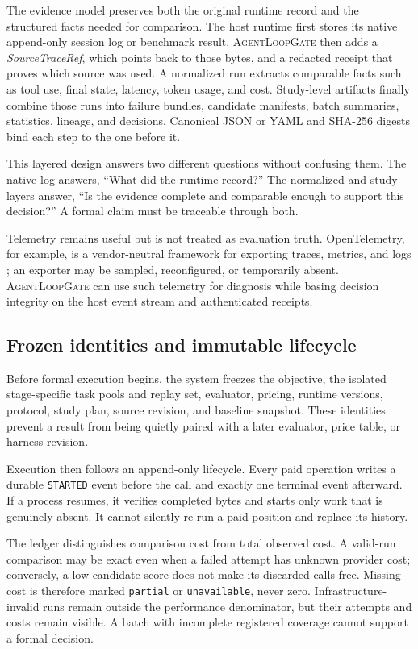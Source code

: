 \documentclass[10pt,twocolumn]{article}
\newcommand{\system}{\textsc{AgentLoopGate}\xspace}
\newcommand{\code}[1]{\texttt{#1}}
\begin{document}
The evidence model preserves both the original runtime record and the
structured facts needed for comparison. The host runtime first stores its
native append-only session log or benchmark result. \system then adds a
\emph{SourceTraceRef}, which points back to those bytes, and a redacted receipt
that proves which source was used. A normalized run extracts comparable facts
such as tool use, final state, latency, token usage, and cost. Study-level
artifacts finally combine those runs into failure bundles, candidate manifests,
batch summaries, statistics, lineage, and decisions. Canonical JSON or YAML and
SHA-256 digests bind each step to the one before it.

This layered design answers two different questions without confusing them.
The native log answers, ``What did the runtime record?'' The normalized and
study layers answer, ``Is the evidence complete and comparable enough to
support this decision?'' A formal claim must be traceable through both.

Telemetry remains useful but is not treated as evaluation truth.
OpenTelemetry, for example, is a vendor-neutral framework for exporting
traces, metrics, and logs \cite{opentelemetry2026}; an exporter may be sampled,
reconfigured, or temporarily absent. \system can use such telemetry for
diagnosis while basing decision integrity on the host event stream and
authenticated receipts.

\subsection{Frozen identities and immutable lifecycle}

Before formal execution begins, the system freezes the objective, the isolated
stage-specific task pools and replay set, evaluator, pricing, runtime versions,
protocol, study plan, source revision, and baseline snapshot. These identities
prevent a result from being quietly paired with a later evaluator, price table,
or harness revision.

Execution then follows an append-only lifecycle. Every paid operation writes a
durable \code{STARTED} event before the call and exactly one terminal event
afterward. If a process resumes, it verifies completed bytes and starts only
work that is genuinely absent. It cannot silently re-run a paid position and
replace its history.

The ledger distinguishes comparison cost from total observed cost. A valid-run
comparison may be exact even when a failed attempt has unknown provider cost;
conversely, a low candidate score does not make its discarded calls free.
Missing cost is therefore marked \code{partial} or \code{unavailable}, never
zero. Infrastructure-invalid runs remain outside the performance denominator,
but their attempts and costs remain visible. A batch with incomplete registered
coverage cannot support a formal decision.
\end{document}
